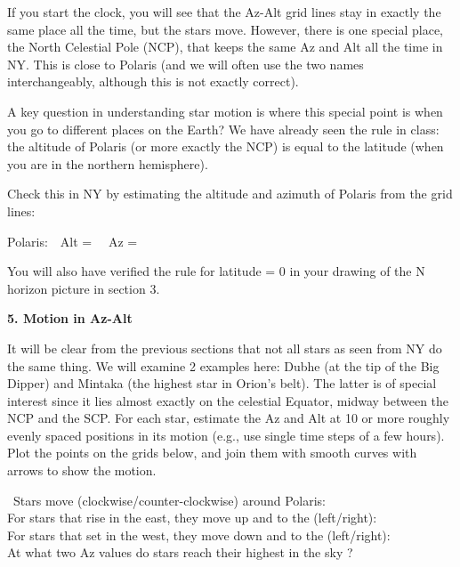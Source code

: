 \documentclass[12pt]{article}
\begin{document}
If you start the clock, you will see that the Az-Alt
grid lines stay in exactly the same place all the time, but the stars
move. However, there is one special place, the North Celestial Pole
(NCP), that keeps the same Az and Alt all the time in NY. This is
close to Polaris (and we will often use the two names interchangeably,
although this is not exactly correct).

A key question in understanding star motion is where this special
point is when you go to different places on the Earth?  We have
already seen the rule in class: the altitude of Polaris (or more
exactly the NCP) is equal to the latitude (when you are in the northern
hemisphere).

\bigskip
Check this in NY by estimating the altitude and azimuth of Polaris
from the grid lines:
\bigskip

Polaris:\ \ Alt = \makebox[4cm]{\hrulefill} \ \ Az =  \makebox[4cm]{\hrulefill}

\bigskip
You will also have verified the rule for latitude = 0 in your drawing
of the N horizon picture in section 3.

\vspace{4cm}
\bigskip\noindent
{\bf 5. Motion in Az-Alt}

\medskip\noindent
It will be clear from the previous sections that not all stars as seen
from NY do the same thing. We will examine 2 examples here: Dubhe (at
the tip of the Big Dipper) and Mintaka (the highest star in Orion's
belt). The latter is of special interest since it lies almost exactly
on the celestial Equator, midway between the NCP and the SCP.  For
each star, estimate the Az and Alt at 10 or more roughly evenly spaced
positions in its motion (e.g., use single time steps of a few
hours). Plot the points on the grids below, and join them with smooth
curves with arrows to show the motion.

\newpage
        \begin{figure*}[h]
        \centerline{}
         \end{figure*}

\,
\bigskip
\noindent
Stars move (clockwise/counter-clockwise) around Polaris:\
\makebox[4cm]{\hrulefill}\\ 
For stars that rise in the east, they move up and to the
(left/right): \makebox[4cm]{\hrulefill}\\ 
For stars that set in the west, they move down and to the
(left/right): \makebox[4cm]{\hrulefill}\\ 
At what two Az values do  stars reach their highest in the sky ?\
\makebox[4cm]{\hrulefill} \\
\end{document}
